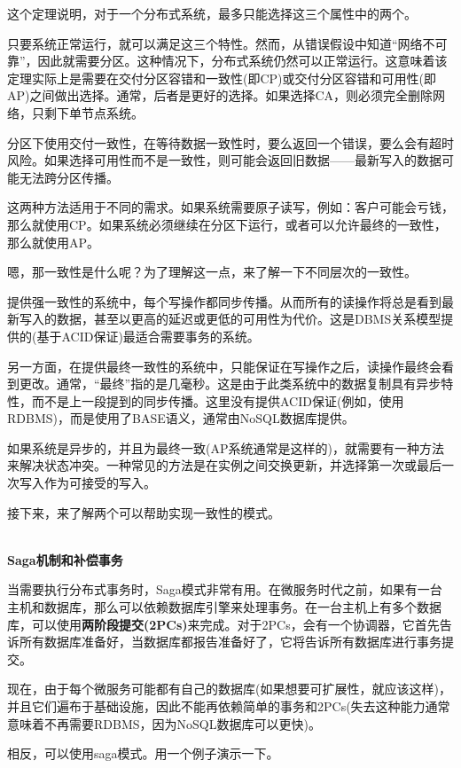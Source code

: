 这个定理说明，对于一个分布式系统，最多只能选择这三个属性中的两个。

只要系统正常运行，就可以满足这三个特性。然而，从错误假设中知道“网络不可靠”，因此就需要分区。这种情况下，分布式系统仍然可以正常运行。这意味着该定理实际上是需要在交付分区容错和一致性(即CP)或交付分区容错和可用性(即AP)之间做出选择。通常，后者是更好的选择。如果选择CA，则必须完全删除网络，只剩下单节点系统。

分区下使用交付一致性，在等待数据一致性时，要么返回一个错误，要么会有超时风险。如果选择可用性而不是一致性，则可能会返回旧数据——最新写入的数据可能无法跨分区传播。

这两种方法适用于不同的需求。如果系统需要原子读写，例如：客户可能会亏钱，那么就使用CP。如果系统必须继续在分区下运行，或者可以允许最终的一致性，那么就使用AP。

嗯，那一致性是什么呢？为了理解这一点，来了解一下不同层次的一致性。

提供强一致性的系统中，每个写操作都同步传播。从而所有的读操作将总是看到最新写入的数据，甚至以更高的延迟或更低的可用性为代价。这是DBMS关系模型提供的(基于ACID保证)最适合需要事务的系统。

另一方面，在提供最终一致性的系统中，只能保证在写操作之后，读操作最终会看到更改。通常，“最终”指的是几毫秒。这是由于此类系统中的数据复制具有异步特性，而不是上一段提到的同步传播。这里没有提供ACID保证(例如，使用RDBMS)，而是使用了BASE语义，通常由NoSQL数据库提供。

如果系统是异步的，并且为最终一致(AP系统通常是这样的)，就需要有一种方法来解决状态冲突。一种常见的方法是在实例之间交换更新，并选择第一次或最后一次写入作为可接受的写入。

接下来，来了解两个可以帮助实现一致性的模式。

\hspace*{\fill} \\ %
\noindent
\textbf{Saga机制和补偿事务}

当需要执行分布式事务时，Saga模式非常有用。在微服务时代之前，如果有一台主机和数据库，那么可以依赖数据库引擎来处理事务。在一台主机上有多个数据库，可以使用\textbf{两阶段提交(2PCs)}来完成。对于2PCs，会有一个协调器，它首先告诉所有数据库准备好，当数据库都报告准备好了，它将告诉所有数据库进行事务提交。

现在，由于每个微服务可能都有自己的数据库(如果想要可扩展性，就应该这样)，并且它们遍布于基础设施，因此不能再依赖简单的事务和2PCs(失去这种能力通常意味着不再需要RDBMS，因为NoSQL数据库可以更快)。

相反，可以使用saga模式。用一个例子演示一下。

